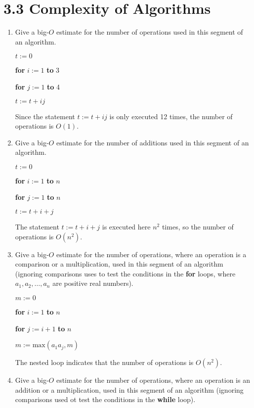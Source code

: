 \documentclass[11pt]{article}
\begin{document}
\section*{\textbf{3.3 Complexity of Algorithms}}
\begin{enumerate}[label=\textbf{\arabic*.}]
	\item Give a big-$O$ estimate for the number of operations used in this segment of an algorithm.
	
	$t := 0$
	
	\textbf{for} $i := 1$ \textbf{to} 3
	
	\qquad \textbf{for} $j := 1$ \textbf{to} 4
	
	\qquad\qquad $t := t + ij$
	
	Since the statement $t := t + ij$ is only executed 12 times, the number of operations is $O(1)$.
	
	\item Give a big-$O$ estimate for the number of additions used in this segment of an algorithm.
	
	$t := 0$
	
	\textbf{for} $i := 1$ \textbf{to} $n$
	
	\qquad \textbf{for} $j := 1$ \textbf{to} $n$
	
	\qquad\qquad $t := t + i + j$
	
	The statement $t := t + i + j$ is executed here $n^2$ times, so the number of operations is $O(n^2)$.
	
	\item Give a big-$O$ estimate for the number of operations, where an operation is a comparison or a multiplication, used in this segment of an algorithm (ignoring comparisons uses to test the conditions in the \textbf{for} loops, where $a_1, a_2, \ldots, a_n$ are positive real numbers).
	
	$m := 0$
	
	\textbf{for} $i := 1$ \textbf{to} $n$
	
	\qquad \textbf{for} $j := i + 1$ \textbf{to} $n$
	
	\qquad\qquad $m := \text{max}(a_1a_j, m)$
	
	The nested loop indicates that the number of operations is $O(n^2)$.
	
	\item Give a big-$O$ estimate for the number of operations, where an operation is an addition or a multiplication, used in this segment of an algorithm (ignoring comparisons used ot test the conditions in the \textbf{while} loop).
	

\end{enumerate}
\end{document}
